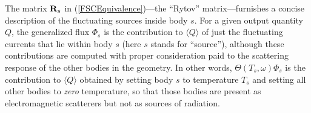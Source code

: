 \documentclass[letterpaper]{article}
\begin{document}
The matrix $\mathbf{R}_s$ in (\ref{FSCEquivalence})---the ``Rytov''
matrix---furnishes a concise description of the fluctuating sources
inside body $s$. For a given output quantity 
$Q$, the generalized flux $\Phi_s$ is the contribution to 
$\langle Q \rangle$ 
of just the fluctuating currents that lie within body $s$
(here $s$ stands for ``source''), although these contributions
are computed with proper consideration paid to the scattering
response of the other bodies in the geometry. In other words,
$\Theta(T_s,\omega)\Phi_s$ is the contribution to 
$\langle Q \rangle$ 
obtained by setting body $s$ to temperature $T_s$ and setting
all other bodies to \textit{zero} temperature, so that those
bodies are present as electromagnetic scatterers but not as 
sources of radiation.
%
%
%
\end{document}
